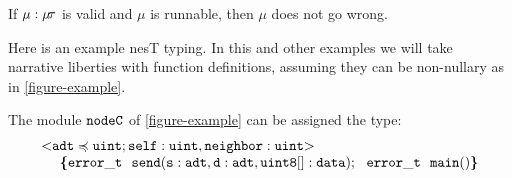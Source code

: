 \begin{conject}
  If $\mu : \jmodtcat$ is valid and $\mu$ is runnable, then $\mu$ does not go wrong.
\end{conject}
Here is an example nesT typing. In this and other examples we will take narrative liberties with
function definitions, assuming they can be non-nullary as in \autoref{figure-example}.
\begin{exmp}
\label{example-nesttyping}
The module $\tt{nodeC}$ of \autoref{figure-example} can be assigned the type:
$$
\begin{array}{l}
\margs{\tt{adt} \subtype \tt{uint}; \tt{self : uint}, \tt{neighbor : uint} \tt}\\
\ \ \ \ \lc
\tt{error\_t\ \ send}(\tt{s : adt}, \tt{d : adt}, \tt{uint8[] : data});\ \ 
\tt{error\_t\ \  main()} 
\rc
\end{array}
$$
\end{exmp}
